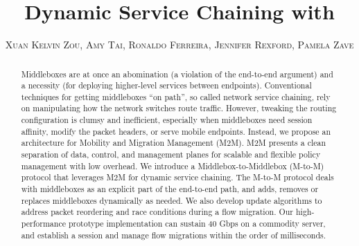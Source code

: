 \documentclass{sig-alternate-10pt}
\title{\LARGE\textbf{Dynamic Service Chaining with \system}}
\author{\textsc{Xuan Kelvin Zou, Amy Tai, Ronaldo Ferreira, Jennifer Rexford, Pamela Zave} }
\begin{document}
\maketitle  
\begin{abstract}


  Middleboxes   are   at once  an   abomination   (a  violation of the
  end-to-end argument)  and a   necessity (for deploying  higher-level
  services between  endpoints).   Conventional techniques  for getting
  middleboxes ``on path'', so called network service chaining, rely on
  manipulating how  the  network  switches route  traffic.    However,
  tweaking   the routing  configuration   is clumsy  and  inefficient,
  especially when middleboxes need session affinity, modify the packet
  headers, or   serve   mobile endpoints.   Instead,  we   propose  an
  architecture for   Mobility  and Migration Management   (M2M).   M2M
  presents a clean separation of data,  control, and management planes
  for scalable and  flexible policy management  with low overhead.  We
  introduce a Middlebox-to-Middlebox  (M-to-M) protocol that leverages
  M2M for dynamic service   chaining.  The M-to-M protocol  deals with
  middleboxes  as an explicit part  of the end-to-end  path, and adds,
  removes   or replaces  middleboxes  dynamically as  needed.  We also
  develop  update algorithms to  address   packet reordering and  race
  conditions during  a flow migration. Our  high-performance prototype
  implementation   can  sustain 40  Gbps on   a commodity  server, and
  establish a session and  manage flow migrations  within the order of
  milliseconds.


 



\end{abstract}
\end{document}
